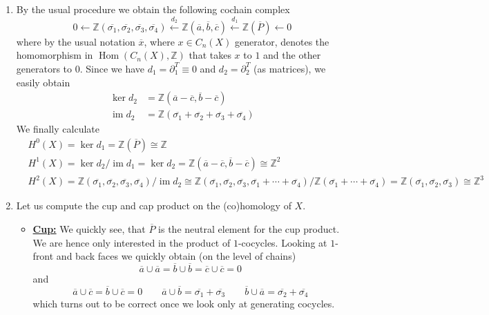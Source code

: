 \documentclass[a4paper, 12pt]{article}
\DeclareMathOperator{\im}{im}
\DeclareMathOperator{\Hom}{Hom}
\newcommand{\Z}{\mathbb{Z}}
\newcommand{\iso}{\cong}
\begin{document}
\begin{enumerate}[label=(\alph*)]
	\item By the usual procedure we obtain the following cochain complex
	\[
	0 \xleftarrow{} \Z(\overline{\sigma_1}, \overline{\sigma_2}, \overline{\sigma_3}, \overline{\sigma_4}) \xleftarrow{d_2} \Z(\overline{a}, \overline{b}, \overline{c}) \xleftarrow{d_1} \Z(\overline{P}) \xleftarrow{} 0
	\]
	where by the usual notation $\overline{x}$, where $x \in C_n(X)$ generator, denotes the homomorphism in $\Hom(C_n(X), \Z)$ that takes $x$ to $1$ and the other generators to $0$. Since we have $d_1 = \partial_1^{T} \equiv 0$ and $d_2 = \partial_2^{T}$ (as matrices), we easily obtain
	\begin{align*}
	\ker d_2 &= \Z(\overline{a} - \overline{c}, \overline{b} - \overline{c})\\
	\im d_2 &= \Z(\overline{\sigma_1} + \overline{\sigma_2} + \overline{\sigma_3} + \overline{\sigma_4})
	\end{align*}
	We finally calculate
	\begin{align*}
	&H^{0}(X) = \ker d_1 = \Z(\overline{P}) \iso \Z \\
	&H^{1}(X) = \ker d_2 / \im d_1 = \ker d_2 = \Z(\overline{a} - \overline{c}, \overline{b} - \overline{c}) \iso \Z^2\\
	&H^{2}(X) = \Z(\overline{\sigma_1}, \overline{\sigma_2}, \overline{\sigma_3}, \overline{\sigma_4}) / \im d_2 \iso \Z(\overline{\sigma_1}, \overline{\sigma_2}, \overline{\sigma_3}, \overline{\sigma_1} + \cdots + \overline{\sigma_4}) / \Z(\overline{\sigma_1} + \cdots + \overline{\sigma_4}) = \Z(\overline{\sigma_1}, \overline{\sigma_2}, \overline{\sigma_3}) \iso \Z^3
	\end{align*}
	
	\item Let us compute the cup and cap product on the (co)homology of $X$.
	\begin{itemize}
		\item \underline{\textbf{Cup:}} We quickly see, that $\overline{P}$ is the neutral element for the cup product. We are hence only interested in the product of $1$-cocycles. Looking at $1$-front and back faces we quickly obtain (on the level of chains)
		\[
		\overline{a} \cup \overline{a} = \overline{b} \cup \overline{b} = \overline{c} \cup \overline{c} = 0
		\]
		and
		\[
		\overline{a} \cup \overline{c} = \overline{b} \cup \overline{c} = 0 \quad\quad \overline{a} \cup \overline{b} = \overline{\sigma_1} + \overline{\sigma_3} \quad\quad \overline{b} \cup \overline{a} = \overline{\sigma_2} + \overline{\sigma_4}
		\]
		which turns out to be correct once we look only at generating cocycles.
		

\end{itemize}
\end{enumerate}
\end{document}
